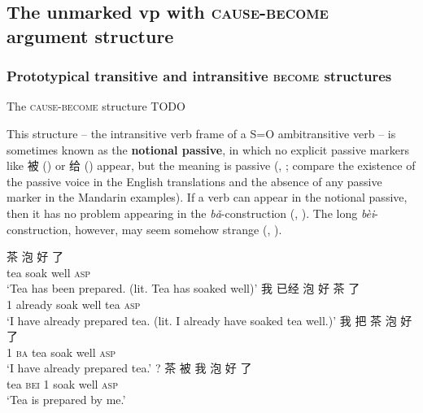 \documentclass[UTF8, a4paper, oneside, scheme=plain]{ctexrep}
\newcommand*{\concept}[1]{\textbf{#1}}
\newcommand{\corpus}[1]{\emph{#1}}
\newcommand{\translate}[1]{`#1'}
\newcommand*{\category}[1]{\textsc{#1}}
\begin{document}
\subsection{The unmarked \acs{vp} with \category{cause}-\category{become} argument structure}

\subsubsection{Prototypical transitive and intransitive \category{become} structures}
\label{sec:verb-phrase.cause-become.ordinary}

The \category{cause}-\category{become} structure TODO

This structure -- the intransitive verb frame of a S=O ambitransitive verb -- 
is sometimes known as the \concept{notional passive}, 
in which no explicit passive markers like 被 
()
or 给 () appear, 
but the meaning is passive
(,
; 
compare the existence of the passive voice in the English translations
and the absence of any passive marker in the Mandarin examples).
If a verb can appear in the notional passive,
then it has no problem appearing in the \corpus{bǎ}-construction
(, ).
The long \corpus{bèi}-construction, however, 
may seem somehow strange
(, ).

\begin{exe}
    \ex\label{ex:verb-phrase.notional-pass.1} 
    \gll 茶 泡 好 了 \\
    tea soak well \category{asp} \\
    \translate{Tea has been prepared.
    (lit. Tea has soaked well)}
    \ex\label{ex:verb-phrase.notional-pass.trans-1} 
    \gll 我 已经 泡 好 茶 了 \\
    1 already soak well tea \category{asp} \\
    \glt \translate{I have already prepared tea. (lit. I already have soaked tea well.)}
    \ex\label{ex:verb-phrase.notional-pass.ba-1}
    \gll 我 把 茶 泡 好 了 \\
    1 \category{ba} tea soak well \category{asp} \\
    \glt \translate{I have already prepared tea.}
    \ex\label{ex:verb-phrase.notional-pass.bei-1} 
    \gll ? 茶 被 我 泡 好 了 \\
    {} tea \category{bei} 1 soak well \category{asp} \\
    \glt \translate{Tea is prepared by me.}
\end{exe}
\end{document}
